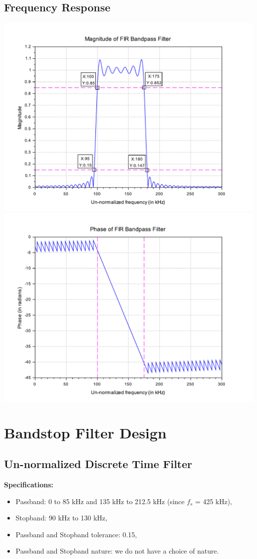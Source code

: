 \documentclass[12pt]{article}
\begin{document}
\subsection{Frequency Response}
\begin{center}
    \includegraphics[scale=0.6]{mag_bp.pdf}
    \includegraphics[scale=0.6]{phase_bp.pdf}
\end{center}

\section{Bandstop Filter Design}
\subsection{Un-normalized Discrete Time Filter}
\hline
\vspace{10pt}
\textbf{Specifications:}
\begin{itemize}
    \item Passband: 0 to 85 kHz and 135 kHz to 212.5 kHz (since $f_s$ = 425 kHz),
    \item Stopband: 90 kHz to 130 kHz,
    \item Passband and Stopband tolerance: 0.15,
    \item Passband and Stopband nature: we do not have a choice of nature.
\end{itemize}
\hline
\end{document}
